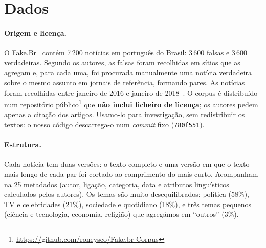 \section{Dados}\label{sec:dados}

\paragraph{Origem e licença.}
O Fake.Br~\cite{monteiro2018} contém 7\,200 notícias em português do Brasil: 3\,600 falsas e
3\,600 verdadeiras. Segundo os autores, as falsas foram recolhidas em sítios que as agregam e,
para cada uma, foi procurada manualmente uma notícia verdadeira sobre o mesmo assunto em jornais de
referência, formando pares. As notícias foram recolhidas entre janeiro de 2016 e janeiro de
2018~\cite{santos2020}. O corpus é
distribuído num repositório público\footnote{\url{https://github.com/roneysco/Fake.br-Corpus}}
que \textbf{não inclui ficheiro de licença}; os autores pedem apenas a citação dos artigos.
Usamo-lo para investigação, sem redistribuir os textos: o nosso código descarrega-o num
\emph{commit} fixo (\texttt{780f551}).

\paragraph{Estrutura.}
Cada notícia tem duas versões: o texto completo e uma versão em que o texto mais longo de cada
par foi cortado ao comprimento do mais curto. Acompanham-na 25 metadados (autor, ligação, categoria,
data e atributos linguísticos calculados pelos autores). Os temas são muito desequilibrados:
política (58\%), TV e celebridades (21\%), sociedade e quotidiano (18\%), e três temas pequenos
(ciência e tecnologia, economia, religião) que agregámos em ``outros'' (3\%).



